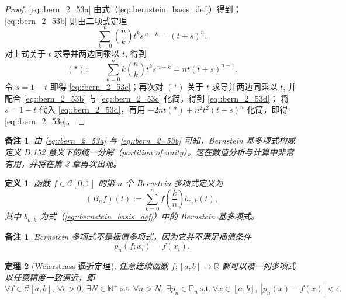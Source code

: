 \documentclass[a4paper]{ctexart}
\newtheorem{theorem}{定理}
\newtheorem{remark}{备注}
\newtheorem*{remark*}{备注}
\newtheorem{definition}[theorem]{定义} %
\numberwithin{theorem}{section}
\numberwithin{equation}{section}
\numberwithin{figure}{section}
\numberwithin{remark}{section}
\begin{document}
\begin{proof}
\eqref{eq::bern_2_53a} 由式（\ref{eq::bernstein_basis_def}）得到；\eqref{eq::bern_2_53b} 则由二项式定理
\begin{equation}
\sum_{k=0}^{n}\binom{n}{k} t^{k} s^{\,n-k}=(t+s)^{n}.
\end{equation}
对上式关于 $t$ 求导并两边同乘以 $t$, 得到
\begin{equation*}
(\ast):\qquad \sum_{k=0}^{n} k \binom{n}{k} t^{k} s^{\,n-k}=n t (t+s)^{n-1}.
\end{equation*}
令 $s=1-t$ 即得 \eqref{eq::bern_2_53c}；再次对 $(\ast)$ 关于 $t$ 求导并两边同乘以 $t$, 并配合
\eqref{eq::bern_2_53b} 与 \eqref{eq::bern_2_53c} 化简，得到 \eqref{eq::bern_2_53d}；
将 $s=1-t$ 代入 \eqref{eq::bern_2_53d}，再用 $-2 n t(\ast)+n^{2} t^{2}(t+s)^{n}$ 化简，即得 \eqref{eq::bern_2_53e}。
\end{proof}

\begin{remark}
由 \eqref{eq::bern_2_53a} 与 \eqref{eq::bern_2_53b} 可知，Bernstein 基多项式构成定义 D.152 
意义下的统一分解（partition of unity）。这在数值分析与计算中非常有用，并将在第 3 章再次出现。
\end{remark}

\begin{definition}
    \label{def::bernstein_polynomial}
函数 $f\in\mathcal{C}[0,1]$ 的第 $n$ 个 Bernstein 多项式定义为
\begin{equation}
    \label{eq::bernstein_polynomial}
(B_n f)(t):=\sum_{k=0}^{n} f\!\left(\frac{k}{n}\right) b_{n,k}(t),
\end{equation}
其中 $b_{n,k}$ 为式（\ref{eq::bernstein_basis_def}）中的 Bernstein 基多项式。
\end{definition}

\begin{remark*}
Bernstein 多项式不是插值多项式，因为它并不满足插值条件 
$$
p_n(f;x_i)=f(x_i).
$$    
\end{remark*}

\begin{theorem}[Weierstrass 逼近定理]
任意连续函数 $f:[a,b]\to\mathbb{R}$ 都可以被一列多项式以任意精度一致逼近，即
\begin{equation}
    \label{eq::weierstrass_theorem}
\forall f\in\mathcal{C}[a,b],\ \forall \epsilon>0,\ \exists N\in\mathbb{N}^+\ \text{s.t.}\ \forall n>N,\ 
\exists p_n\in \mathbb{P}_n\ \text{s.t.}\ \forall x\in[a,b],\ |p_n(x)-f(x)|<\epsilon.
\end{equation}
\end{theorem}
\end{document}
